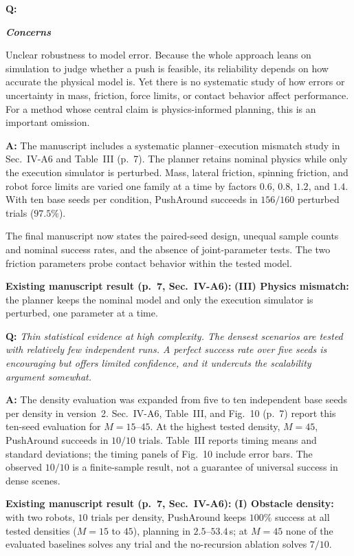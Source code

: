 \documentclass[11pt]{article}
\begin{document}
\begin{shaded*}
\noindent \textbf{Q:}
{\itshape
\textbf{Concerns}

Unclear robustness to model error.
Because the whole approach leans on simulation to judge whether a push
is feasible, its reliability depends on how accurate the physical model
is. Yet there is no systematic study of how errors or uncertainty in
mass, friction, force limits, or contact behavior affect performance.
For a method whose central claim is physics-informed planning, this is
an important omission.
}
\end{shaded*}

\noindent \textbf{A:}
The manuscript includes a systematic planner--execution mismatch study in
Sec.~IV-A6 and Table~III (p.~7). The planner retains nominal physics while
only the execution simulator is perturbed. Mass, lateral friction, spinning
friction, and robot force limits are varied one family at a time by factors
$0.6$, $0.8$, $1.2$, and $1.4$. With ten base seeds per condition, PushAround
succeeds in $156/160$ perturbed trials ($97.5\%$).

The final manuscript now states the paired-seed design, unequal sample counts
and nominal success rates, and the absence of joint-parameter tests. The two
friction parameters probe contact behavior within the tested model.
\par\smallskip\noindent\textbf{Existing manuscript result (p.~7, Sec.~IV-A6):}
\textbf{(III) Physics mismatch:} the planner keeps the nominal model and only
the execution simulator is perturbed, one parameter at a time.


\begin{shaded*}
\noindent \textbf{Q:}
{\itshape
Thin statistical evidence at high complexity.
The densest scenarios are tested with relatively few independent runs.
A perfect success rate over five seeds is encouraging but offers
limited confidence, and it undercuts the scalability argument somewhat.
}
\end{shaded*}

\noindent \textbf{A:}
The density evaluation was expanded from five to ten independent base seeds
per density in version~2. Sec.~IV-A6, Table~III, and Fig.~10 (p.~7) report this
ten-seed evaluation for $M=15$--$45$. At the highest tested density,
$M=45$, PushAround succeeds in $10/10$ trials. Table~III reports timing
means and standard deviations; the timing panels of Fig.~10 include error
bars. The observed $10/10$ is a finite-sample result, not a guarantee of
universal success in dense scenes.
\par\smallskip\noindent\textbf{Existing manuscript result (p.~7, Sec.~IV-A6):}
\textbf{(I) Obstacle density:} with two robots, $10$ trials per density,
PushAround keeps $100\%$ success at all tested densities ($M{=}15$ to $45$), planning in $2.5$--$53.4$\,s; at $M{=}45$ none of the evaluated baselines solves any trial
and the no-recursion ablation solves $7/10$.
\end{document}
